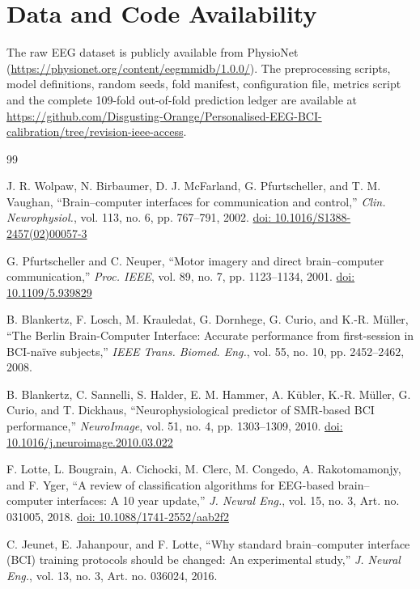 \documentclass{ieeeaccess}
\newcommand{\doiref}[1]{\href{https://doi.org/#1}{doi: #1}}
\begin{document}
\section*{Data and Code Availability}

The raw EEG dataset is publicly available from PhysioNet (\url{https://physionet.org/content/eegmmidb/1.0.0/}). The preprocessing scripts, model definitions, random seeds, fold manifest, configuration file, metrics script and the complete 109-fold out-of-fold prediction ledger are available at \url{https://github.com/Disgusting-Orange/Personalised-EEG-BCI-calibration/tree/revision-ieee-access}.

\begin{thebibliography}{99}

 J. R. Wolpaw, N. Birbaumer, D. J. McFarland, G. Pfurtscheller, and T. M. Vaughan, ``Brain--computer interfaces for communication and control,'' \emph{Clin. Neurophysiol.}, vol. 113, no. 6, pp. 767--791, 2002. \doiref{10.1016/S1388-2457(02)00057-3}

 G. Pfurtscheller and C. Neuper, ``Motor imagery and direct brain--computer communication,'' \emph{Proc. IEEE}, vol. 89, no. 7, pp. 1123--1134, 2001. \doiref{10.1109/5.939829}

 B. Blankertz, F. Losch, M. Krauledat, G. Dornhege, G. Curio, and K.-R. M\"uller, ``The Berlin Brain-Computer Interface: Accurate performance from first-session in BCI-na\"ive subjects,'' \emph{IEEE Trans. Biomed. Eng.}, vol. 55, no. 10, pp. 2452--2462, 2008.

 B. Blankertz, C. Sannelli, S. Halder, E. M. Hammer, A. K\"ubler, K.-R. M\"uller, G. Curio, and T. Dickhaus, ``Neurophysiological predictor of SMR-based BCI performance,'' \emph{NeuroImage}, vol. 51, no. 4, pp. 1303--1309, 2010. \doiref{10.1016/j.neuroimage.2010.03.022}

 F. Lotte, L. Bougrain, A. Cichocki, M. Clerc, M. Congedo, A. Rakotomamonjy, and F. Yger, ``A review of classification algorithms for EEG-based brain--computer interfaces: A 10 year update,'' \emph{J. Neural Eng.}, vol. 15, no. 3, Art. no. 031005, 2018. \doiref{10.1088/1741-2552/aab2f2}

 C. Jeunet, E. Jahanpour, and F. Lotte, ``Why standard brain--computer interface (BCI) training protocols should be changed: An experimental study,'' \emph{J. Neural Eng.}, vol. 13, no. 3, Art. no. 036024, 2016.


\end{thebibliography}
\end{document}
